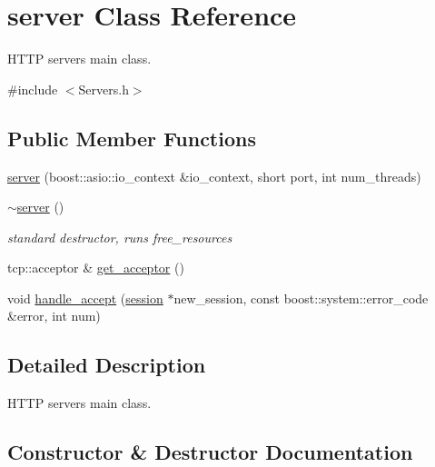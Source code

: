 \hypertarget{classserver}{}\section{server Class Reference}
\label{classserver}


H\+T\+TP server\textquotesingle{}s main class.  




{\ttfamily \#include $<$Servers.\+h$>$}

\subsection*{Public Member Functions}
\begin{DoxyCompactItemize}
\item 
\hyperlink{classserver_a9ad81c9f749b6113ac9aebee191bb7ff}{server} (boost\+::asio\+::io\+\_\+context \&io\+\_\+context, short port, int num\+\_\+threads)
\item 
\mbox{\label{classserver_ae3de4182db6fe6c656036f9e4da49204}} 
\hyperlink{classserver_ae3de4182db6fe6c656036f9e4da49204}{$\sim$server} ()
\begin{DoxyCompactList}\small\item\em standard destructor, runs free\+\_\+resources \end{DoxyCompactList}\item 
tcp\+::acceptor \& \hyperlink{classserver_a90bbf4bdc02734ed4e82e4251090e929}{get\+\_\+acceptor} ()
\item 
void \hyperlink{classserver_a195cc0f2e527393bb307cee99804d66a}{handle\+\_\+accept} (\hyperlink{classsession}{session} $\ast$new\+\_\+session, const boost\+::system\+::error\+\_\+code \&error, int num)
\end{DoxyCompactItemize}


\subsection{Detailed Description}
H\+T\+TP server\textquotesingle{}s main class. 

\subsection{Constructor \& Destructor Documentation}
\mbox{\label{classserver_a9ad81c9f749b6113ac9aebee191bb7ff}} 
